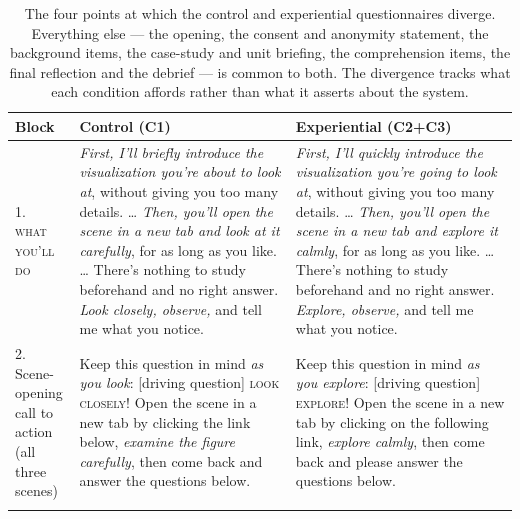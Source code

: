 \begin{table}[tbp]
\centering
\caption[Points of difference between the control and experiential variants]{The four points
at which the control and experiential questionnaires diverge. Everything else --- the opening,
the consent and anonymity statement, the background items, the case-study and unit briefing,
the comprehension items, the final reflection and the debrief --- is common to both. The
divergence tracks what each condition affords rather than what it asserts about the system.}
\label{tab:b-differences}
\footnotesize
\renewcommand{\arraystretch}{1.25}
\begin{tabularx}{\textwidth}{@{}p{2.3cm} X X@{}}
\toprule
\textbf{Block} & \textbf{Control (C1)} & \textbf{Experiential (C2+C3)} \\
\midrule

\makecell[l]{1.\\\textsc{what}\\\textsc{you'll do}} &
\emph{First, I'll briefly introduce the visualization you're about to look at}, without giving
you too many details. \dots{} \emph{Then, you'll open the scene in a new tab and look at it
carefully}, for as long as you like. \dots{} There's nothing to study beforehand and no right
answer. \emph{Look closely, observe,} and tell me what you notice. &
\emph{First, I'll quickly introduce the visualization you're going to look at}, without giving
you too many details. \dots{} \emph{Then, you'll open the scene in a new tab and explore it
calmly}, for as long as you like. \dots{} There's nothing to study beforehand and no right
answer. \emph{Explore, observe,} and tell me what you notice. \\
\addlinespace

\makecell[l]{2.\\Scene-opening\\call to action\\(all three\\scenes)} &
Keep this question in mind \emph{as you look}: [driving question] \newline
\textsc{look closely!} \newline
Open the scene in a new tab by clicking the link below, \emph{examine the figure carefully},
then come back and answer the questions below. &
Keep this question in mind \emph{as you explore}: [driving question] \newline
\textsc{explore!} \newline
Open the scene in a new tab by clicking on the following link, \emph{explore calmly}, then come
back and please answer the questions below. \\
\addlinespace


\end{tabularx}
\end{table}
